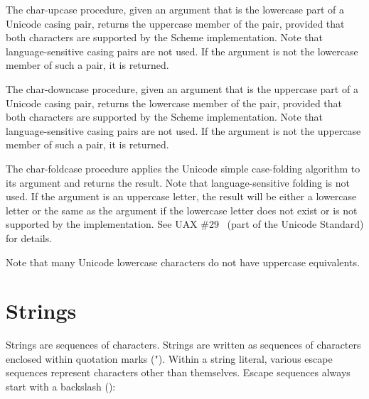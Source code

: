 \begin{entry}{%
}


The {\cf char-upcase} procedure, given an argument that is the
lowercase part of a Unicode casing pair, returns the uppercase member
of the pair, provided that both characters are supported by the Scheme
implementation.  Note that language-sensitive casing pairs are not used.  If the
argument is not the lowercase member of such a pair, it is returned.

The {\cf char-downcase} procedure, given an argument that is the
uppercase part of a Unicode casing pair, returns the lowercase member
of the pair, provided that both characters are supported by the Scheme
implementation.  Note that language-sensitive casing pairs are not used.  If the
argument is not the uppercase member of such a pair, it is returned.

The {\cf char-foldcase} procedure applies the Unicode simple
case-folding algorithm to its argument and returns the result.  Note that
language-sensitive folding is not used.  If the argument is an uppercase
letter, the result will be either a lowercase letter
or the same as the argument if the lowercase letter does not exist or
is not supported by the implementation.
See UAX \#29~\cite{uax29} (part of the Unicode Standard) for details.

Note that many Unicode lowercase characters do not have uppercase
equivalents.

\end{entry}


\section{Strings}
\label{stringsection}

Strings are sequences of characters.  
\vest Strings are written as sequences of characters enclosed within quotation marks
({\cf "}).  Within a string literal, various escape
sequences represent characters other than
themselves.  Escape sequences always start with a backslash (\backwhack{}):

